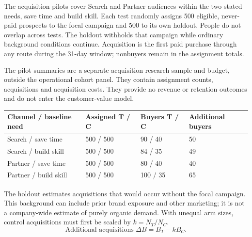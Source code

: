 \documentclass[10pt]{article}
\begin{document}
The acquisition pilots cover Search and Partner audiences within the two stated needs, save time and build skill. Each test randomly assigns 500 eligible, never-paid prospects to the focal campaign and 500 to its own holdout. People do not overlap across tests. The holdout withholds that campaign while ordinary background conditions continue. Acquisition is the first paid purchase through any route during the 31-day window; nonbuyers remain in the assignment totals.

The pilot summaries are a separate acquisition research sample and budget, outside the operational cohort panel. They contain assignment counts, acquisitions and acquisition costs. They provide no revenue or retention outcomes and do not enter the customer-value model.
{\fontsize{8.5}{10.5}\selectfont \par\begin{tabularx}{\linewidth}{@{}p{.29\linewidth}YYY@{}}\toprule
\textbf{Channel / baseline need} & \textbf{Assigned T / C} & \textbf{Buyers T / C} & \textbf{Additional buyers}\\\midrule
Search / save time & 500 / 500 & 90 / 40 & 50\\
Search / build skill & 500 / 500 & 84 / 35 & 49\\
Partner / save time & 500 / 500 & 80 / 40 & 40\\
Partner / build skill & 500 / 500 & 100 / 35 & 65\\
\bottomrule\end{tabularx}\par}
The holdout estimates acquisitions that would occur without the focal campaign. This background can include prior brand exposure and other marketing; it is not a company-wide estimate of purely organic demand. With unequal arm sizes, control acquisitions must first be scaled by $k=N_T/N_C$.
\[
\text{Additional acquisitions }\Delta B=B_T-kB_C.
\]
\end{document}
